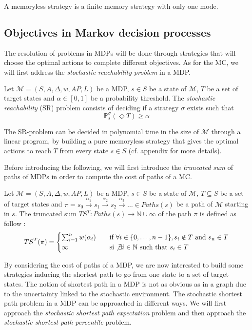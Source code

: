 \begin{property}
  A memoryless strategy is a finite memory strategy with only one mode.
\end{property}

\subsection{Objectives in Markov decision processes}
The resolution of problems in MDPs will be done through strategies that will choose the optimal actions to complete different objectives. As for the MC, we will first address the \textit{stochastic reachability problem} in a MDP.
\begin{definition}
  Let $\mathcal{M}=(S, A, \Delta, w, AP, L)$ be a MDP, $s \in S$ be a state of $\mathcal{M}$, $T$ be a set of target states and $\alpha \in [0, 1]$ be
  a probability threshold. The \textit{stochastic reachability} (SR) problem consists
  of deciding if a strategy $\sigma$ exists such that
  \[
    \mathbb{P}_s^\sigma(\Diamond T) \geq \alpha
  \]
\end{definition}

\begin{theorem}
  The SR-problem can be decided in polynomial time in the size of $\mathcal{M}$
  through a linear program, by building a pure memoryless strategy that gives the optimal actions to reach $T$ from every state $s \in S$ (cf. appendix for more details).
\end{theorem}

Before introducing the following, we will first introduce the \textit{truncated sum} of paths of MDPs in order to compute the cost of paths of a MC.

\begin{definition}
	Let $\mathcal{M} = (S, A, \Delta, w, AP, L)$ be a MDP, $s \in S$ be a state of $\mathcal{M}$, $T \subseteq S$ be a set of target states and
	$\pi = s_0 \xrightarrow{\alpha_1} s_1 \xrightarrow{\alpha_2} s_2 \xrightarrow{\alpha_3} \dots \in Paths(s)$ be a path of
	$\mathcal{M}$ starting in $s$. The truncated sum $TS^T : Paths(s)
	\rightarrow \mathbb{N} \cup {\infty}$ of the path $\pi$ is defined as follow :
	\[
		TS^T(\pi) =
		\begin{cases}
			\sum_{i = 1}^{n} w(\alpha_i) & \quad \text{if } \forall i \in \{0, \dots, n - 1\}, s_i \notin T \text{ and } s_n \in T \\
			\infty & \quad \text{si $ \not \exists i \in \mathbb{N}$ such that $s_i \in T$}
		\end{cases}
	\]

\end{definition}

By considering the cost of paths of a MDP, we are now interested to build some
strategies inducing the shortest path to go from one state to a set of target
states. The notion of shortest path in a MDP is not as obvious as in a graph due to the uncertainty linked to the stochastic environment.
The stochastic shortest path problem in a MDP can be approached in different
ways. We will first approach the \textit{stochastic shortest path expectation} problem and
then approach the \textit{stochastic shortest path percentile} problem.
